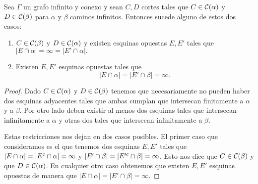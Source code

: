 \documentclass[tesis.tex]{subfiles}
\begin{document}
\begin{lema}\label{lema_esquinas_caminos}
	
	Sea $\Gamma$ un grafo infinito y conexo y sean $C,D$ cortes tales que $C \in {\cal C}(\alpha)$ y $D \in {\cal C}(\beta)$ para $\alpha$ y $\beta$ caminos infinitos.
	Entonces sucede alguno de estos dos casos:
	\begin{enumerate}
		\item $C \in {\cal C}(\beta)$ y $D \in {\cal C}(\alpha)$ y existen esquinas opuestas $E, E'$ tales que $|E \cap \alpha| = \infty = |E' \cap \alpha|.$
		
		\item Existen $E, E'$ esquinas opuestas tales que
		\[
		|E \cap \alpha| = |E' \cap \beta | = \infty. 
		\]
		
	\end{enumerate}
\end{lema}
\begin{proof}
	Dado $C \in {\cal C}(\alpha)$ y $D \in {\cal C}(\beta)$ tenemos que necesariamente no pueden haber dos esquinas adyacentes tales que ambas cumplan que intersecan finitamente a $\alpha$ y a $\beta$.
	Por otro lado deben existir al menos dos esquinas tales que intersecan infinitamente a $\alpha$ y otras dos tales que intersecan infinitamente a $\beta$. 
	
	Estas restricciones nos dejan en dos casos posibles.
	El primer caso que consideramos es el que tenemos dos esquinas $E, E'$ tales que $|E \cap \alpha| = |E^{c} \cap \alpha| = \infty$ y $|E' \cap \beta| = |E'^{c} \cap \beta|=\infty$.
	Esto nos dice que $C \in {\cal C}(\beta)$ y que $D \in {\cal C}(\alpha)$.
	En cualquier otro caso obtenemos que existen $E,E'$ esquinas opuestas de manera que $|E \cap \alpha| = |E' \cap \beta | = \infty$.
	
\end{proof}
\end{document}
